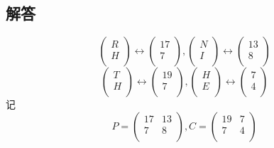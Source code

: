\documentclass[12pt]{article}
\begin{document}
    \subsection*{解答}
    $$
    \begin{pmatrix}
        R\\
        H\\  
    \end{pmatrix}
    \leftrightarrow 
    \begin{pmatrix}
        17\\
        7\\
    \end{pmatrix}
    ,
    \begin{pmatrix}
        N\\
        I\\
    \end{pmatrix}
    \leftrightarrow
    \begin{pmatrix}
        13\\
        8\\
    \end{pmatrix}
    $$
    $$
    \begin{pmatrix}
        T\\
        H\\
    \end{pmatrix}
    \leftrightarrow
    \begin{pmatrix}
        19\\
        7\\
    \end{pmatrix}
    ,
    \begin{pmatrix}
        H\\
        E\\
    \end{pmatrix}
    \leftrightarrow
    \begin{pmatrix}
        7\\
        4\\
    \end{pmatrix}
    $$
    记
    $$ P = 
        \begin{pmatrix}
            17 & 13\\
            7 & 8\\
        \end{pmatrix},
      C = 
        \begin{pmatrix}
            19 & 7\\
            7 & 4\\
        \end{pmatrix}
    $$
\end{document}
